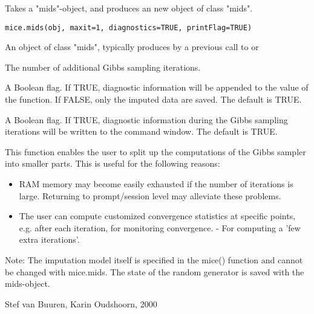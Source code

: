 \begin{Description}\relax
Takes a "mids"-object, and produces an new object of class "mids".
\end{Description}
\begin{Usage}
\begin{verbatim}
mice.mids(obj, maxit=1, diagnostics=TRUE, printFlag=TRUE)
\end{verbatim}
\end{Usage}
\begin{Arguments}
\begin{ldescription}
\item[\code{obj}] An object of class "mids", typically produces by a previous call
to  or  
\item[\code{maxit}] The number of additional Gibbs sampling iterations. 
\item[\code{diagnostics}] A Boolean flag. If TRUE, diagnostic information will be appended to 
the value of the function. If FALSE, only the imputed data are saved. 
The default is TRUE.
\item[\code{printFlag}] A Boolean flag. If TRUE, diagnostic information during the Gibbs sampling
iterations will be written to the command window.  The default is TRUE.
\end{ldescription}
\end{Arguments}
\begin{Details}\relax
This function enables the user to split up the computations of the 
Gibbs sampler into smaller parts. This is useful for the following
reasons:
\begin{itemize}
\item RAM memory may become easily exhausted if the number of iterations is 
large. Returning to prompt/session level may alleviate these problems.
\item The user can compute customized convergence statistics at specific
points, e.g. after each iteration, for monitoring convergence.
- For computing a 'few extra iterations'.
\end{itemize}
Note: The imputation model itself is specified in the mice() function
and cannot be changed with mice.mids.
The state of the random generator is saved with the mids-object.
\end{Details}
\begin{Author}\relax
Stef van Buuren, Karin Oudshoorn, 2000
\end{Author}
